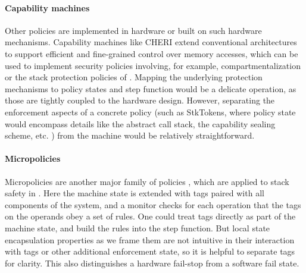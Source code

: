\documentclass[acmsmall,review,anonymous]{acmart}\settopmatter{printfolios=true,printccs=false,printacmref=false}
\begin{document}
\paragraph*{Capability machines}
%
Other policies are implemented in hardware or built on such hardware mechanisms.
Capability machines like CHERI \citep{Woodruff+14} extend conventional
architectures to support efficient and fine-grained control over memory
accesses, which can be used to implement security policies involving, for
example, compartmentalization or the stack protection policies of
\citet{Skorstengaard+19,Skorstengaard+19b}. Mapping the underlying protection
mechanisms to policy states and step function would be a delicate operation, as
those are tightly coupled to the hardware design. However, separating the
enforcement aspects of a concrete policy (such as StkTokens, where policy state
would encompass details like the abstract call stack, the capability sealing
scheme, etc. ) from
the machine would be relatively straightforward.

\newcommand{\TAGS}{\mathcal{T}}
\newcommand{\tagname}{t}
\newcommand{\uP}{{\mu P}}

\paragraph*{Micropolicies}
%
Micropolicies are another major family of policies \citep{pump_oakland2015},
which are applied to stack safety in \citep{DBLP:conf/sp/RoesslerD18}.
Here the machine state is extended with tags paired with all components of the
system, and a monitor checks for each operation that the tags on the operands
obey a set of rules. One could treat tags directly as part of the machine
state, and build the rules into the step function. But local state
encapsulation properties as we frame them are not intuitive in their
interaction with tags or other additional enforcement state, so it is helpful
to separate tags for clarity. This also distinguishes a hardware fail-stop from
a software fail state.
\end{document}
